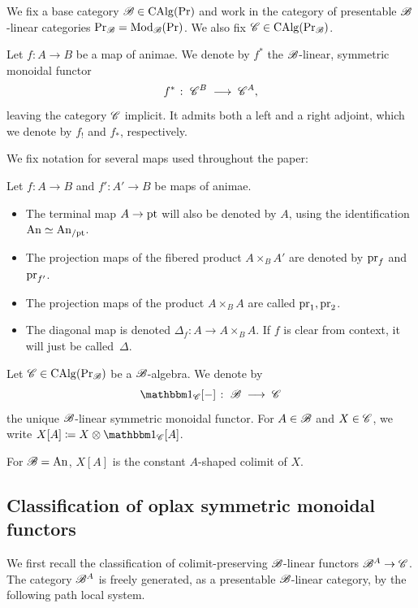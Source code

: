 \documentclass[english,svgnames,table]{article}
\begin{document}
We fix a base category $\mathscr{B} \in \operatorname{CAlg}(\operatorname{Pr})$ and work in the category of presentable $\mathscr{B}$-linear categories $\operatorname{Pr}_{\mathscr{B}} = \operatorname{Mod}_{\mathscr{B}}(\operatorname{Pr})$.
We also fix $\mathscr{C}\in\operatorname{CAlg}(\operatorname{Pr}_{\mathscr{B}})$.

Let $f \colon A \to B$ be a map of animae. We denote by $f^*$ the $\mathscr{B}$-linear, symmetric monoidal functor
\begin{equation*}
    f^* \;\colon\; \mathscr{C}^B \;\longrightarrow\; \mathscr{C}^A,
\end{equation*}
leaving the category $\mathscr{C}$ implicit.
It admits both a left and a right adjoint, which we denote by $f_!$ and $f_*$, respectively.

We fix notation for several maps used throughout the paper:
\begin{notation}
    Let $f \colon A \to B$ and $f' \colon A' \to B$ be maps of animae.
    \begin{itemize}
        \item The terminal map $A \to \mathrm{pt}$ will also be denoted by $A$, using the identification $\mathrm{An} \simeq \mathrm{An}_{/\mathrm{pt}}$.
        \item The projection maps of the fibered product $A \times_B A'$ are denoted by $\mathrm{pr}_f$ and $\mathrm{pr}_{f'}$.
        \item The projection maps of the product $A \times_B A$ are called $\mathrm{pr}_1, \mathrm{pr}_2$.
        \item The diagonal map is denoted $\Delta_f \colon A \to A \times_B A$. If $f$ is clear from context, it will just be called~$\Delta$.
    \end{itemize}
\end{notation}

\begin{notation}
    Let $\mathscr{C} \in \operatorname{CAlg}(\operatorname{Pr}_{\mathscr{B}})$ be a $\mathscr{B}$-algebra. We denote by
    \begin{equation*}
        \ounit_{\cC}[-] \;\colon\; \basecat \;\too\; \cC
    \end{equation*}
    the unique $\mathscr{B}$-linear symmetric monoidal functor.
    For $A \in \mathscr{B}$ and $X \in \mathscr{C}$, we write $X[A] \coloneq X \otimes \ounit_{\cC}[A]$.

     For $\mathscr{B} = \mathrm{An}$, $X[A]$ is the constant $A$-shaped colimit of $X$.
\end{notation}

\subsection{Classification of oplax symmetric monoidal functors}
\label{subsec:oplax-functors}
    We first recall the classification of colimit-preserving $\mathscr{B}$-linear functors $\mathscr{B}^A \to \mathscr{C}$.
    The category $\mathscr{B}^A$ is freely generated, as a presentable $\mathscr{B}$-linear category, by the following path local system.
\end{document}
